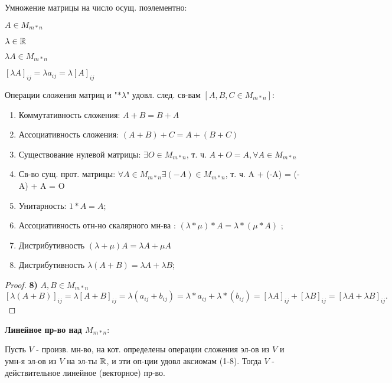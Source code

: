 \begin{definition}
    Умножение матрицы на число осущ. поэлементно:

$A \in M_{m * n}$ 

$\lambda \in \mathbb{R}$ 

$\lambda A \in M_{m * n}$

$[\lambda A]_{ij} = \lambda a_{ij} = \lambda [A]_{ij}$
\end{definition}

\begin{theorem}
Операции сложения матриц и  "$* \lambda$" удовл. след. св-вам $[A, B, C \in M_{m * n}]$:

\begin{enumerate}
    \item Коммутативность сложения: $ A + B = B + A$
    \item Ассоциативность сложения: $ (A + B) + C = A + (B + C)$
    \item Существование нулевой матрицы: $ \exists O \in M_{m * n}$, т. ч. $A + O = A, \forall A \in M_{m * n}$
    \item Св-во сущ. прот. матрицы: $\forall A \in M_{m * n} \exists (-A) \in M_{m * n}$, т. ч. A + (-A) = (-A) + A = O
    \item Унитарность: $1 * A = A$;
    \item Ассоциативность отн-но скалярного мн-ва : $(\lambda * \mu) * A = \lambda * (\mu * A)$ ;
    \item Дистрибутивность $(\lambda + \mu) A = \lambda A + \mu A$ 
    \item Дистрибутивность $\lambda (A + B) = \lambda A + \lambda B$;
\end{enumerate}
\end{theorem}

\begin{proof}
\textbf{8) } $A, B \in M_{m * n}$ 
\[
[\lambda(A + B)]_{ij} = \lambda[A + B]_{ij} = \lambda (a_{ij} + b_{ij}) = \lambda * a_{ij} + \lambda * (b_{ij}) = [\lambda A]_{ij} + [\lambda B]_{ij} = [\lambda A + \lambda B]_{ij} 
.\] 
\end{proof}

\begin{definition}
\textbf{Линейное пр-во над $M_{m*n}$}:

Пусть $V$ - произв. мн-во, на кот. определены операции сложения эл-ов из $V$ и умн-я эл-ов из $V$ на эл-ты $\mathbb{R}$, и эти оп-ции удовл аксиомам (1-8). Тогда $V$ - действительное линейное (векторное) пр-во.
\end{definition}


